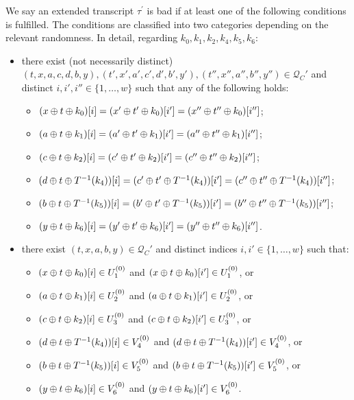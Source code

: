 \begin{definition}
	\label{defn:bad-tau-6-rounds}
	
	We say an extended transcript $\tau^{\prime}$ is bad if at least one of the following conditions is fulfilled. The conditions are classified into two categories depending on the relevant randomness. In detail, regarding $k_0,k_1,k_2,k_4,k_5,k_6$:
	\begin{itemize}[leftmargin=10mm]
		\item[\cone] there exist (not necessarily distinct) $(t,x,a,c,d,b,y),(t',x',a',c',d',b',y'),(t'',x'',a'',b'',y'')\in \mathcal{Q}_{C}'$ and distinct $i, i', i'' \in \{1, \ldots, w\}$ such that any of the following holds:
		\begin{itemize}
			\item $(x\oplus t\oplus k_0)[i]=(x'\oplus t'\oplus k_0)[i']=(x''\oplus t''\oplus k_0)[i'']$;
			\item $(a\oplus t\oplus k_1)[i]=(a'\oplus t'\oplus k_1)[i']=(a''\oplus t''\oplus k_1)[i'']$;
			\item $(c\oplus t\oplus k_2)[i]=(c'\oplus t'\oplus k_2)[i']=(c''\oplus t''\oplus k_2)[i'']$;
			\item $(d\oplus t\oplus T^{-1}(k_4))[i]=(c'\oplus t'\oplus T^{-1}(k_4))[i']=(c''\oplus t''\oplus T^{-1}(k_4))[i'']$;
			\item $(b\oplus t\oplus T^{-1}(k_5))[i]=(b'\oplus t'\oplus T^{-1}(k_5))[i']=(b''\oplus t''\oplus T^{-1}(k_5))[i'']$;
			\item $(y\oplus t\oplus k_6)[i]=(y'\oplus t'\oplus k_6)[i']=(y''\oplus t''\oplus k_6)[i'']$.
		\end{itemize}
		\item[\ctwo] there exist $(t,x,a,b,y) \in \mathcal{Q}_{C}'$ and distinct indices $i, i' \in \{1, \ldots, w\}$ such that:
		\begin{itemize}
			\item $(x\oplus t\oplus k_0)[i]\in U_1^{(0)}$ and $(x\oplus t\oplus k_0)[i']\in U_1^{(0)}$, or
			\item $(a\oplus t \oplus k_1)[i]\in U_{2}^{(0)}$ and $(a\oplus t \oplus k_1)[i']\in U_{2}^{(0)}$, or
			\item $(c\oplus t \oplus k_2)[i]\in U_{3}^{(0)}$ and $(c\oplus t \oplus k_2)[i']\in U_{3}^{(0)}$, or
			\item $(d\oplus t\oplus T^{-1}(k_4))[i]\in V_4^{(0)}$ and
			$(d\oplus t\oplus T^{-1}(k_4))[i']\in V_4^{(0)}$, or
			\item $(b\oplus t\oplus T^{-1}(k_5))[i]\in V_5^{(0)}$ and
			$(b\oplus t\oplus T^{-1}(k_5))[i']\in V_5^{(0)}$, or
			\item $(y\oplus t\oplus k_6)[i]\in V_6^{(0)}$ and $(y\oplus t\oplus k_6)[i']\in V_6^{(0)}$.

\end{itemize}
\end{itemize}
\end{definition}
